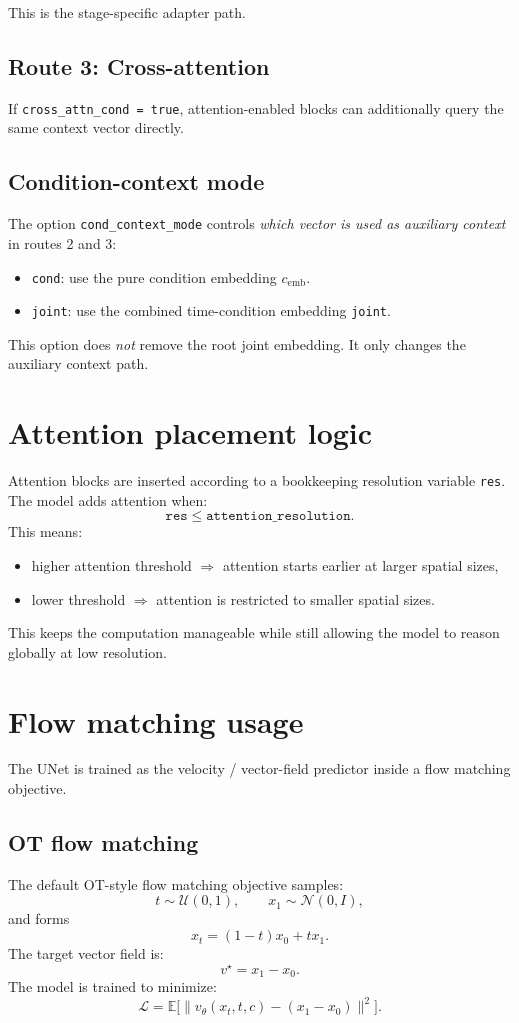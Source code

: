 \documentclass[11pt]{article}
\begin{document}
This is the stage-specific adapter path.

\subsection{Route 3: Cross-attention}
If \texttt{cross\_attn\_cond = true}, attention-enabled blocks can additionally query the same context vector directly.

\subsection{Condition-context mode}
The option \texttt{cond\_context\_mode} controls \emph{which vector is used as auxiliary context} in routes 2 and 3:
\begin{itemize}
  \item \texttt{cond}: use the pure condition embedding $c_{\mathrm{emb}}$.
  \item \texttt{joint}: use the combined time-condition embedding \texttt{joint}.
\end{itemize}

This option does \emph{not} remove the root joint embedding. It only changes the auxiliary context path.

\section{Attention placement logic}
Attention blocks are inserted according to a bookkeeping resolution variable \texttt{res}. The model adds attention when:
\[
\texttt{res} \leq \texttt{attention\_resolution}.
\]
This means:
\begin{itemize}
  \item higher attention threshold \(\Rightarrow\) attention starts earlier at larger spatial sizes,
  \item lower threshold \(\Rightarrow\) attention is restricted to smaller spatial sizes.
\end{itemize}

This keeps the computation manageable while still allowing the model to reason globally at low resolution.

\section{Flow matching usage}
The UNet is trained as the velocity / vector-field predictor inside a flow matching objective.

\subsection{OT flow matching}
The default OT-style flow matching objective samples:
\[
t \sim \mathcal{U}(0,1), \qquad x_1 \sim \mathcal{N}(0, I),
\]
and forms
\[
x_t = (1-t)x_0 + t x_1.
\]
The target vector field is:
\[
v^\star = x_1 - x_0.
\]
The model is trained to minimize:
\[
\mathcal{L} = \mathbb{E}\big[\|v_\theta(x_t, t, c) - (x_1 - x_0)\|^2\big].
\]
\end{document}

